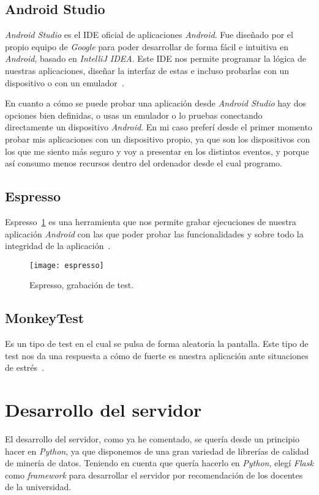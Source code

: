 \subsection{Android Studio}
\textit{Android Studio} es el IDE oficial de aplicaciones \textit{Android}. Fue diseñado por el propio equipo de \textit{Google} para poder desarrollar de forma fácil e intuitiva en \textit{Android}, basado en \textit{IntelliJ IDEA}. Este IDE nos permite programar la lógica de nuestras aplicaciones, diseñar la interfaz de estas e incluso probarlas con un dispositivo o con un emulador~\cite{androidstudio}.

En cuanto a cómo se puede probar una aplicación desde \textit{Android Studio} hay dos opciones bien definidas, o usas un emulador o lo pruebas conectando directamente un dispositivo \textit{Android}. En mi caso preferí desde el primer momento probar mis aplicaciones con un dispositivo propio, ya que son los dispositivos con los que me siento más seguro y voy a presentar en los distintos eventos, y porque así consumo menos recursos dentro del ordenador desde el cual programo.
\subsection{Espresso}
Espresso~\ref{fig:espresso} es una herramienta que nos permite grabar ejecuciones de nuestra aplicación \textit{Android} con las que poder probar las funcionalidades y sobre todo la integridad de la aplicación~\cite{espresso}.

\begin{figure}
	\centering
	\texttt{[image: espresso]}
	\caption{Espresso, grabación de test.}
	\label{fig:espresso}
\end{figure}
\subsection{MonkeyTest}
Es un tipo de test en el cual se pulsa de forma aleatoria la pantalla. Este tipo de test nos da una respuesta a cómo de fuerte es nuestra aplicación ante situaciones de estrés~\cite{monkeytest}.
\section{Desarrollo del servidor}
El desarrollo del servidor, como ya he comentado, se quería desde un principio hacer en \textit{Python}, ya que disponemos de una gran variedad de librerías de calidad de minería de datos. Teniendo en cuenta que quería hacerlo en \textit{Python}, elegí \textit{Flask} como \textit{framework} para desarrollar el servidor por recomendación de los docentes de la universidad.

